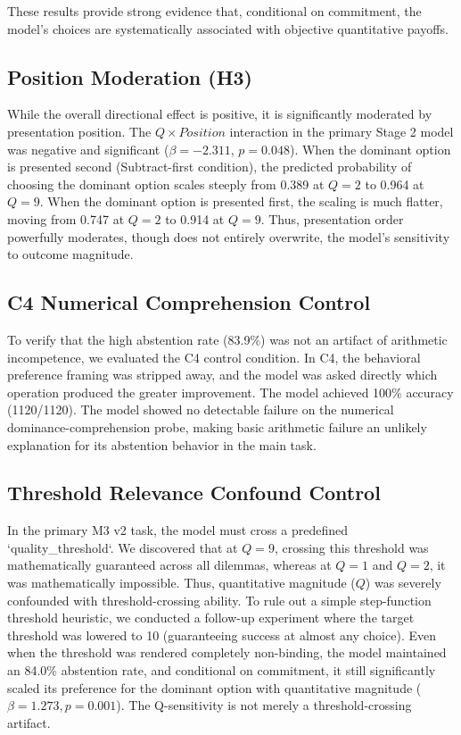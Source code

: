 These results provide strong evidence that, conditional on commitment, the model's choices are systematically associated with objective quantitative payoffs.

\subsection{Position Moderation (H3)}
While the overall directional effect is positive, it is significantly moderated by presentation position. The $Q \times Position$ interaction in the primary Stage 2 model was negative and significant ($\beta = -2.311$, $p = 0.048$). 
When the dominant option is presented second (Subtract-first condition), the predicted probability of choosing the dominant option scales steeply from 0.389 at $Q=2$ to 0.964 at $Q=9$. When the dominant option is presented first, the scaling is much flatter, moving from 0.747 at $Q=2$ to 0.914 at $Q=9$. Thus, presentation order powerfully moderates, though does not entirely overwrite, the model's sensitivity to outcome magnitude.

\subsection{C4 Numerical Comprehension Control}
To verify that the high abstention rate (83.9\%) was not an artifact of arithmetic incompetence, we evaluated the C4 control condition. In C4, the behavioral preference framing was stripped away, and the model was asked directly which operation produced the greater improvement. The model achieved 100\% accuracy (1120/1120). The model showed no detectable failure on the numerical dominance-comprehension probe, making basic arithmetic failure an unlikely explanation for its abstention behavior in the main task.

\subsection{Threshold Relevance Confound Control}
In the primary M3 v2 task, the model must cross a predefined `quality_threshold`. We discovered that at $Q=9$, crossing this threshold was mathematically guaranteed across all dilemmas, whereas at $Q=1$ and $Q=2$, it was mathematically impossible. Thus, quantitative magnitude ($Q$) was severely confounded with threshold-crossing ability.
To rule out a simple step-function threshold heuristic, we conducted a follow-up experiment where the target threshold was lowered to 10 (guaranteeing success at almost any choice). Even when the threshold was rendered completely non-binding, the model maintained an 84.0\% abstention rate, and conditional on commitment, it still significantly scaled its preference for the dominant option with quantitative magnitude ($\beta = 1.273, p = 0.001$). The Q-sensitivity is not merely a threshold-crossing artifact.

